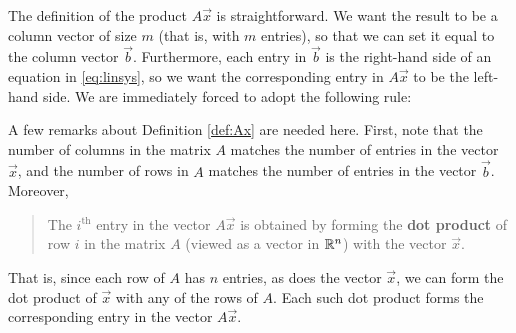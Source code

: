 The definition of the product $A\vec{x}$ is straightforward. We want the result to be a column vector of size $m$ (that is, with $m$ entries), so that we can set it equal to the column vector $\vec{b}$. Furthermore, each entry in $\vec{b}$ is the right-hand side of an equation in \eqref{eq:linsys}, so we want the corresponding entry in $A\vec{x}$ to be the left-hand side. We are immediately forced to adopt the following rule:

\smallskip


\smallskip

A few remarks about Definition \ref{def:Ax} are needed here. First, note that the number of columns in the matrix $A$ matches the number of entries in the vector $\vec{x}$, and the number of rows in $A$ matches the number of entries in the vector $\vec{b}$. Moreover,

\begin{quote}
The $i^{\textrm{th}}$ entry in the vector $A\vec{x}$ is obtained by forming the \textbf{dot product} of row $i$ in the matrix $A$ (viewed as a vector in $\mathbb{R}^n$) with the vector $\vec{x}$.
\end{quote} 

That is, since each row of $A$ has $n$ entries, as does the vector $\vec{x}$, we can form the dot product of $\vec{x}$ with any of the rows of $A$. Each such dot product forms the corresponding entry in the vector $A\vec{x}$.

